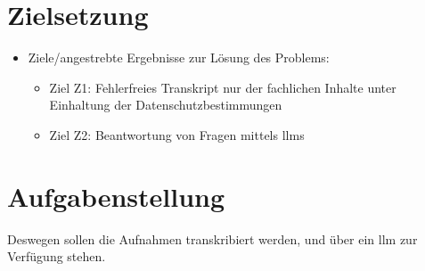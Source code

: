 \section{Zielsetzung}\label{sec:zielsetzung}

\begin{itemize}
\item Ziele/angestrebte Ergebnisse zur Lösung des Problems:
	\begin{itemize}
	\item Ziel Z1: Fehlerfreies Transkript nur der fachlichen Inhalte unter Einhaltung der Datenschutzbestimmungen~\citep{parlament2016verordnung}
	\item Ziel Z2: Beantwortung von Fragen mittels \acp{llm}
	\end{itemize}

\end{itemize}

\section{Aufgabenstellung}

Deswegen sollen die Aufnahmen transkribiert werden, und über ein \ac{llm} zur Verfügung stehen.


